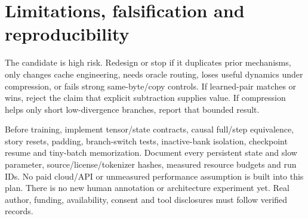 \documentclass[11pt,a4paper]{article}
\begin{document}
\section{Limitations, falsification and reproducibility}
The candidate is high risk. Redesign or stop if it duplicates prior mechanisms,
only changes cache engineering, needs oracle routing, loses useful dynamics under
compression, or fails strong same-byte/copy controls. If learned-pair matches or
wins, reject the claim that explicit subtraction supplies value. If compression
helps only short low-divergence branches, report that bounded result.

Before training, implement tensor/state contracts, causal full/step equivalence,
story resets, padding, branch-switch tests, inactive-bank isolation, checkpoint
resume and tiny-batch memorization. Document every persistent state and slow
parameter, source/license/tokenizer hashes, measured resource budgets and run IDs.
No paid cloud/API or unmeasured performance assumption is built into this plan.
There is no new human annotation or architecture experiment yet. Real author,
funding, availability, consent and tool disclosures must follow verified records.


\end{document}
